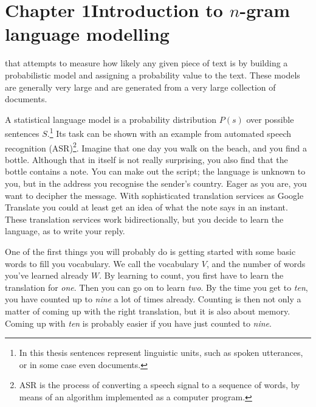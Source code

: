 \chapter{Chapter 1\newline Introduction to $n$-gram language modelling}\label{chap:introlm}
 that attempts to measure how likely any given piece of text is by building a probabilistic model and assigning a probability value to the text. These models are generally very large and are generated from a very large collection of documents.

A statistical language model is a probability distribution $P(s)$ over possible sentences $S$.\footnote{In this thesis sentences represent linguistic units, such as spoken utterances, or in some case even documents.} Its task can be shown with an example from automated speech recognition (ASR)\footnote{ASR is the process of converting a speech signal to a sequence of words, by means of an algorithm implemented as a computer program.}. Imagine that one day you walk on the beach, and you find a bottle. Although that in itself is not really surprising, you also find that the bottle contains a note. You can make out the script; the language is unknown to you, but in the address you recognise the sender's country. Eager as you are, you want to decipher the message. With sophisticated translation services as Google Translate you could at least get an idea of what the note says in an instant. These translation services work bidirectionally, but you decide to learn the language, as to write your reply.

One of the first things you will probably do is getting started with some basic words to fill you vocabulary. We call the vocabulary $V$, and the number of words you've learned already $W$. By learning to count, you first have to learn the translation for \emph{one}. Then you can go on to learn \emph{two}. By the time you get to \emph{ten}, you have counted up to \emph{nine} a lot of times already. Counting is then not only a matter of coming up with the right translation, but it is also about memory. Coming up with \emph{ten} is probably easier if you have just counted to \emph{nine}.

